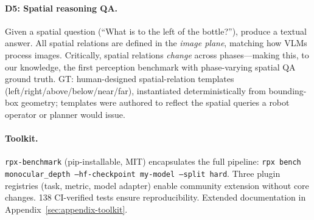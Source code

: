 \paragraph{D5: Spatial reasoning QA.}
Given a spatial question (``What is to the left of the bottle?''), produce a textual answer.
All spatial relations are defined in the \textit{image plane}, matching how VLMs process images.
Critically, spatial relations \textit{change} across phases---making this, to our knowledge, the first perception benchmark with phase-varying spatial QA ground truth.
GT: human-designed spatial-relation templates (left/right/above/below/near/far), instantiated deterministically from bounding-box geometry; templates were authored to reflect the spatial queries a robot operator or planner would issue.

\paragraph{Toolkit.}
\label{sec:toolkit}
\texttt{rpx-benchmark} (pip-installable, MIT) encapsulates the full pipeline:
\texttt{rpx bench monocular\_depth --hf-checkpoint my-model --split hard}.
Three plugin registries (task, metric, model adapter) enable community extension without core changes.
138 CI-verified tests ensure reproducibility.
Extended documentation in Appendix~\ref{sec:appendix-toolkit}.

